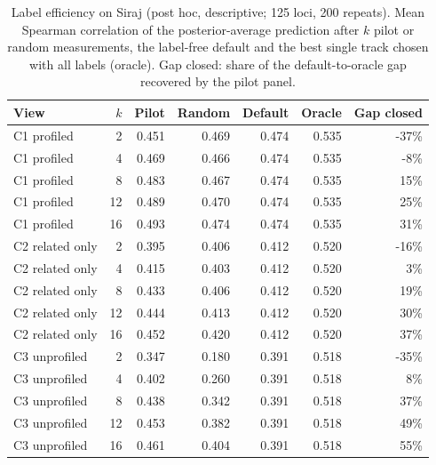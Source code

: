 \renewcommand{\thetable}{S\arabic{table}}

\begin{table}[H]
\caption{Label efficiency on Siraj (post hoc, descriptive; 125 loci, 200 repeats). Mean Spearman correlation of the posterior-average prediction after $k$ pilot or random measurements, the label-free default and the best single track chosen with all labels (oracle). Gap closed: share of the default-to-oracle gap recovered by the pilot panel.}\label{tab:s7}
\centering\small
\begin{tabular}{lrrrrrr}
\toprule
View & $k$ & Pilot & Random & Default & Oracle & Gap closed \\
\midrule
C1 profiled & 2 & 0.451 & 0.469 & 0.474 & 0.535 & -37\% \\
C1 profiled & 4 & 0.469 & 0.466 & 0.474 & 0.535 & -8\% \\
C1 profiled & 8 & 0.483 & 0.467 & 0.474 & 0.535 & 15\% \\
C1 profiled & 12 & 0.489 & 0.470 & 0.474 & 0.535 & 25\% \\
C1 profiled & 16 & 0.493 & 0.474 & 0.474 & 0.535 & 31\% \\
C2 related only & 2 & 0.395 & 0.406 & 0.412 & 0.520 & -16\% \\
C2 related only & 4 & 0.415 & 0.403 & 0.412 & 0.520 & 3\% \\
C2 related only & 8 & 0.433 & 0.406 & 0.412 & 0.520 & 19\% \\
C2 related only & 12 & 0.444 & 0.413 & 0.412 & 0.520 & 30\% \\
C2 related only & 16 & 0.452 & 0.420 & 0.412 & 0.520 & 37\% \\
C3 unprofiled & 2 & 0.347 & 0.180 & 0.391 & 0.518 & -35\% \\
C3 unprofiled & 4 & 0.402 & 0.260 & 0.391 & 0.518 & 8\% \\
C3 unprofiled & 8 & 0.438 & 0.342 & 0.391 & 0.518 & 37\% \\
C3 unprofiled & 12 & 0.453 & 0.382 & 0.391 & 0.518 & 49\% \\
C3 unprofiled & 16 & 0.461 & 0.404 & 0.391 & 0.518 & 55\% \\
\bottomrule
\end{tabular}
\end{table}

